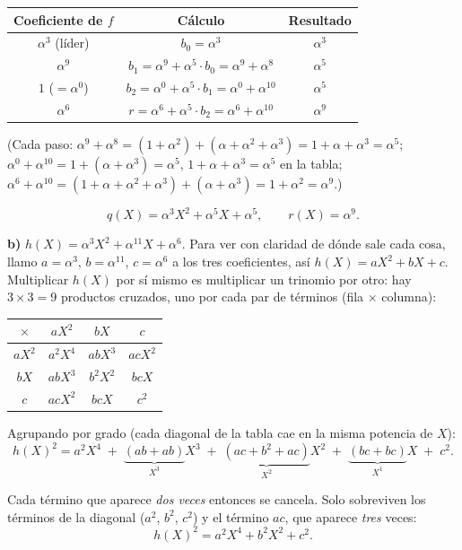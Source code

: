\documentclass[11pt]{article}
\begin{document}
\begin{center}
\renewcommand{\arraystretch}{1.3}
\begin{tabular}{c c c}
\toprule
Coeficiente de $f$ & Cálculo & Resultado \\
\midrule
$\alpha^3$ (líder) & $b_0=\alpha^3$ & $\alpha^3$ \\
$\alpha^9$ & $b_1=\alpha^9+\alpha^5\cdot b_0=\alpha^9+\alpha^8$ & $\alpha^5$ \\
$1$ ($=\alpha^0$) & $b_2=\alpha^0+\alpha^5\cdot b_1=\alpha^0+\alpha^{10}$ & $\alpha^5$ \\
$\alpha^6$ & $r=\alpha^6+\alpha^5\cdot b_2=\alpha^6+\alpha^{10}$ & $\alpha^9$ \\
\bottomrule
\end{tabular}
\end{center}

(Cada paso: $\alpha^9+\alpha^8=(1+\alpha^2)+(\alpha+\alpha^2+\alpha^3)=1+\alpha+\alpha^3=\alpha^5$;
$\alpha^0+\alpha^{10}=1+(\alpha+\alpha^3)=\alpha^5$, $1+\alpha+\alpha^3=\alpha^5$ en la tabla;
$\alpha^6+\alpha^{10}=(1+\alpha+\alpha^2+\alpha^3)+(\alpha+\alpha^3)=1+\alpha^2=\alpha^9$.)

$$q(X) = \alpha^3X^2+\alpha^5X+\alpha^5, \qquad r(X)=\alpha^9.$$


\textbf{b)} $h(X)=\alpha^3X^2+\alpha^{11}X+\alpha^6$. Para ver con claridad de dónde sale cada
cosa, llamo $a=\alpha^3$, $b=\alpha^{11}$, $c=\alpha^6$ a los tres coeficientes, así
$h(X)=aX^2+bX+c$. Multiplicar $h(X)$ por sí mismo es multiplicar un trinomio por otro: hay
$3\times3=9$ productos cruzados, uno por cada par de términos (fila $\times$ columna):
 
\begin{center}
\renewcommand{\arraystretch}{1.4}
\begin{tabular}{c|ccc}
$\times$ & $aX^2$ & $bX$ & $c$ \\
\hline
$aX^2$ & $a^2X^4$ & $abX^3$ & $acX^2$ \\
$bX$   & $abX^3$  & $b^2X^2$& $bcX$   \\
$c$    & $acX^2$  & $bcX$   & $c^2$
\end{tabular}
\end{center}
 
Agrupando por grado (cada diagonal de la tabla cae en la misma potencia de $X$):
$$h(X)^2 = a^2X^4 \;+\; \underbrace{(ab+ab)}_{X^3}X^3 \;+\; \underbrace{(ac+b^2+ac)}_{X^2}X^2 \;+\; \underbrace{(bc+bc)}_{X^1}X \;+\; c^2.$$
 
Cada término que aparece \emph{dos veces} entonces se cancela. Solo 
sobreviven los términos de la diagonal ($a^2$, $b^2$, $c^2$) y el término $ac$, que aparece
\emph{tres} veces:
$$h(X)^2 = a^2X^4 + b^2X^2 + c^2.$$
 
\end{document}
